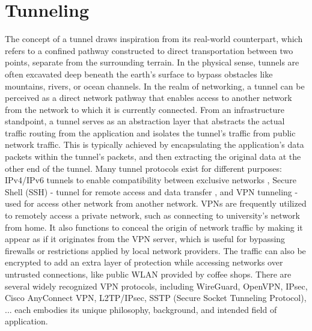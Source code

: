 \section{Tunneling}
The concept of a tunnel draws inspiration from its real-world counterpart, which refers to a confined pathway constructed to direct transportation between two points, separate from the surrounding terrain. 
In the physical sense, tunnels are often excavated deep beneath the earth's surface to bypass obstacles like mountains, rivers, or ocean channels.
In the realm of networking, a tunnel can be perceived as a direct network pathway that enables access to another network from the network to which it is currently connected. 
From an infrastructure standpoint, a tunnel serves as an abstraction layer that abstracts the actual traffic routing from the application and isolates the tunnel's traffic from public network traffic. 
This is typically achieved by encapsulating the application's data packets within the tunnel's packets, and then extracting the original data at the other end of the tunnel.
Many tunnel protocols exist for different purposes: IPv4/IPv6 tunnels to enable compatibility between exclusive networks \cite{rfc4380_Teredo_ipv6_tunnel_udp}, Secure Shell (SSH) - tunnel for remote access and data transfer \cite{rfc4251_ssh_protocol}, and \ac{VPN} tunneling - used for access other network from another network. 
\ac{VPN}s are frequently utilized to remotely access a private network, such as connecting to university's network from home. 
It also functions to conceal the origin of network traffic by making it appear as if it originates from the VPN server, which is useful for bypassing firewalls or restrictions applied by local network providers.
The traffic can also be encrypted to add an extra layer of protection while accessing networks over untrusted connections, like public WLAN provided by coffee shops.
There are several widely recognized VPN protocols, including WireGuard, OpenVPN, IPsec, Cisco AnyConnect VPN, L2TP/IPsec, SSTP (Secure Socket Tunneling Protocol), ... each embodies its unique philosophy, background, and intended field of application.


